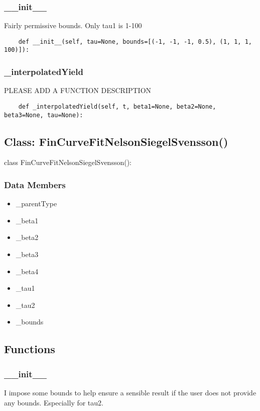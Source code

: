 \documentclass[twoside,11pt]{book}
\begin{document}
\subsubsection*{{\bf \_\_init\_\_}}
Fairly permissive bounds. Only tau1 is 1-100  

\begin{lstlisting}
    def __init__(self, tau=None, bounds=[(-1, -1, -1, 0.5), (1, 1, 1, 100)]):
\end{lstlisting}

\subsubsection*{{\bf \_interpolatedYield}}
PLEASE ADD A FUNCTION DESCRIPTION

\begin{lstlisting}
    def _interpolatedYield(self, t, beta1=None, beta2=None, beta3=None, tau=None):
\end{lstlisting}

\subsection*{Class: FinCurveFitNelsonSiegelSvensson()}
class FinCurveFitNelsonSiegelSvensson(): 

\subsubsection*{Data Members}
\begin{itemize}
\item{\_parentType}
\item{\_beta1}
\item{\_beta2}
\item{\_beta3}
\item{\_beta4}
\item{\_tau1}
\item{\_tau2}
\item{\_bounds}
\end{itemize}

\subsection*{Functions}

\subsubsection*{{\bf \_\_init\_\_}}
I impose some bounds to help ensure a sensible result if the user does not provide any bounds. Especially for tau2.  
\end{document}
